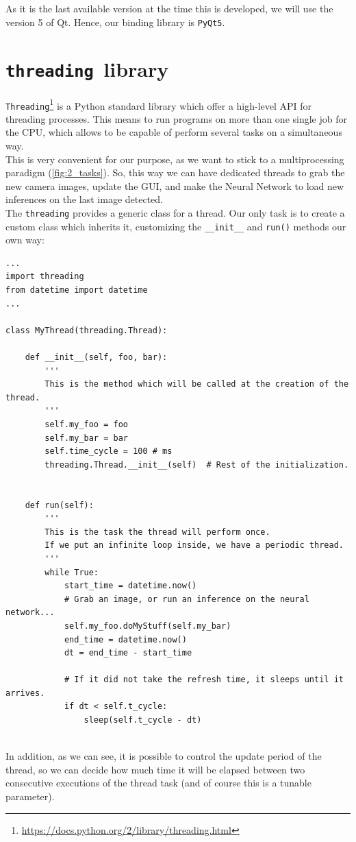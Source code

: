 	As it is the last available version at the time this is developed, we will use the version 5 of Qt. Hence, our binding library is \texttt{PyQt5}.\\
	
\section{\texttt{threading }library}
	\label{sec:3_threading}
	\texttt{Threading}\footnote{\url{https://docs.python.org/2/library/threading.html}} is a Python standard library which offer a high-level API for threading processes. This means to run programs on more than one single job for the CPU, which allows to be capable of perform several tasks on a simultaneous way.\\
	
	This is very convenient for our purpose, as we want to stick to a multiprocessing paradigm (\autoref{fig:2_tasks}). So, this way we can have dedicated threads to grab the new camera images, update the GUI, and make the Neural Network to load new inferences on the last image detected.\\
	
	The \texttt{threading} provides a generic class for a thread. Our only task is to create a custom class which inherits it, customizing the \texttt{\_\_init\_\_} and \texttt{run()} methods our own way:
	

	\begin{lstlisting}
...
import threading
from datetime import datetime
...

class MyThread(threading.Thread):

	def __init__(self, foo, bar):
		'''
		This is the method which will be called at the creation of the thread.
		'''
		self.my_foo = foo
		self.my_bar = bar
		self.time_cycle = 100 # ms
		threading.Thread.__init__(self)  # Rest of the initialization.
		
		
	def run(self):
		'''
		This is the task the thread will perform once.
		If we put an infinite loop inside, we have a periodic thread.
		'''
		while True:
			start_time = datetime.now()
			# Grab an image, or run an inference on the neural network...
			self.my_foo.doMyStuff(self.my_bar)
			end_time = datetime.now()
			dt = end_time - start_time
			
			# If it did not take the refresh time, it sleeps until it arrives.
			if dt < self.t_cycle:
				sleep(self.t_cycle - dt)
				
	\end{lstlisting}
	
In addition, as we can see, it is possible to control the update period of the thread, so we can decide how much time it will be elapsed between two consecutive executions of the thread task (and of course this is a tunable parameter).\\
